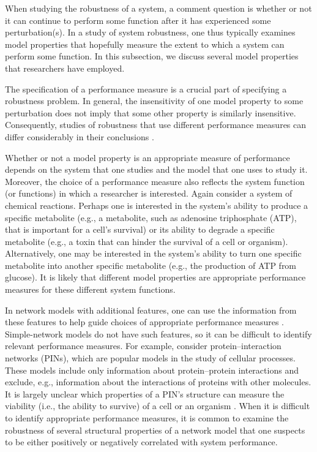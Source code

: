 \documentclass{comnet-mod}
\begin{document}
When studying the robustness of a system, a comment question is whether or not it can continue to perform some function after it has experienced some perturbation(s). In a study of system robustness, one thus typically examines model properties that hopefully measure the extent to which a system can perform some function. In this subsection, we discuss several model properties that researchers have employed.

The specification of a performance measure is a crucial part of specifying a robustness problem. In general, the insensitivity of one model property to some perturbation does not imply that some other property is similarly insensitive. Consequently, studies of robustness that use different performance measures can differ considerably in their conclusions \cite{Ventresca2014}.

Whether or not a model property is an appropriate measure of performance depends on the system that one studies and the model that one uses to study it. Moreover, the choice of a performance measure also reflects the system function (or functions) in which a researcher is interested. Again consider a system of chemical reactions. Perhaps one is interested in the system's ability to produce a specific metabolite (e.g., a metabolite, such as adenosine triphosphate (ATP), that is important for a cell's survival) or its ability to degrade a specific metabolite (e.g., a toxin that can hinder the survival of a cell or organism). Alternatively, one may be interested in the system's ability to turn one specific metabolite into another specific metabolite (e.g., the production of ATP from glucose). It is likely that different model properties are appropriate performance measures for these different system functions.

In network models with additional features, one can use the information from these features to help guide choices of appropriate performance measures \cite{LaRocca2015}. Simple-network models do not have such features, so it can be difficult to identify relevant performance measures. For example, consider protein--interaction networks (PINs), which are popular models in the study of cellular processes. These models include only information about protein--protein interactions and exclude, e.g., information about the interactions of proteins with other molecules. It is largely unclear which properties of a PIN's structure can measure the viability (i.e., the ability to survive) of a cell or an organism \cite{Hakes2008}. When it is difficult to identify appropriate performance measures, it is common to examine the robustness of several structural properties of a network model \cite{Winterbach2011, Bilal2013, Ventresca2014, Yamashita2019} that one suspects to be either positively or negatively correlated with system performance.
\end{document}
